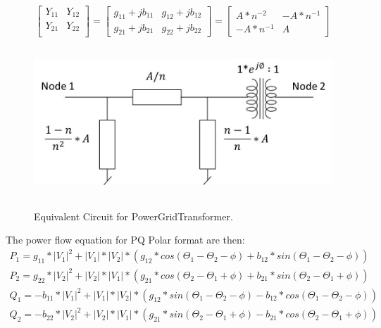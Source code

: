 \begin{equation}
  \left[ \begin{array}{cc} 
         Y_{11} & Y_{12} \\ Y_{21} & Y_{22} \\  
         \end{array} \right] =
  \left[ \begin{array}{cc} 
         g_{11}+jb_{11} & g_{12}+jb_{12} \\  g_{21}+jb_{21} & g_{22}+jb_{22}
         \end{array} \right] =
  \left[ \begin{array}{cc} 
         A*n^{-2} & -A*n^{-1} \\ -A*n^{-1} & A
         \end{array} \right]
\end{equation}
\begin{figure}[ht]
  \centering
  \scalebox{1.0}
  {\includegraphics[width=5.17in,height= 2.21in]{PowerGridTransformer.jpg}}
  \caption[Equivalent Circuit for PowerGridTransformer]{Equivalent Circuit for PowerGridTransformer. \label{figPowerGridTransformer}}
\end{figure}
The power flow equation for PQ Polar format are then:
\begin{eqnarray}
  P_{1} = g_{11} * |V_{1}|^{2} 
        + |V_{1}| * |V_{2}| * (g_{12}*cos(\Theta_{1}-\Theta_{2}-\phi) 
                            + b_{12}*sin(\Theta_{1}-\Theta_{2}-\phi))\\ 
  P_{2} = g_{22} * |V_{2}|^{2} 
        + |V_{2}| * |V_{1}| * (g_{21}*cos(\Theta_{2}-\Theta_{1}+\phi) 
                            + b_{21}*sin(\Theta_{2}-\Theta_{1}+\phi))\\ 
  Q_{1} =  -b_{11} * |V_{1}|^{2} 
        + |V_{1}| * |V_{2}| * (g_{12}*sin(\Theta_{1}-\Theta_{2}-\phi) 
                            - b_{12}*cos(\Theta_{1}-\Theta_{2}-\phi))\\ 
  Q_{2} =  -b_{22} * |V_{2}|^{2} 
        + |V_{2}| * |V_{1}| * (g_{21}*sin(\Theta_{2}-\Theta_{1}+\phi) 
                             - b_{21}*cos(\Theta_{2}-\Theta_{1}+\phi))
\end{eqnarray}


